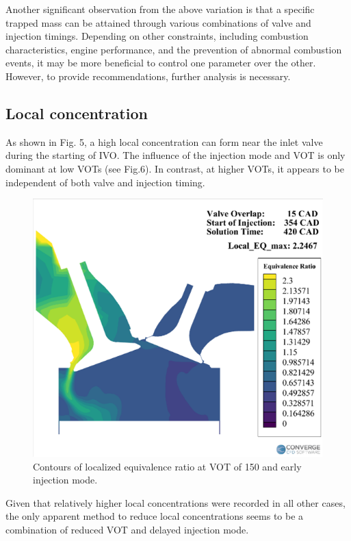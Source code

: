 \documentclass[conference]{IEEEtran}
\begin{document}
Another significant observation from the above variation is that a specific trapped mass can be attained through various combinations of valve and injection timings. 
Depending on other constraints, including combustion characteristics, engine performance, and the prevention of abnormal combustion events, it may be more beneficial to control one parameter over the other. 
However, to provide recommendations, further analysis is necessary.

\subsection{Local concentration}
As shown in Fig. 5, a high local concentration can form near the inlet valve during the starting of IVO. 
The influence of the injection mode and VOT is only dominant at low VOTs (see Fig.6). 
In contrast, at higher VOTs, it appears to be independent of both valve and injection timing.

\begin{figure}[htbp]
    \centerline{\includegraphics{plots and graphs/5.png}}
    \caption{Contours of localized equivalence ratio at VOT of 150 and early injection mode.}
    \label{plt_5}
    \end{figure}

Given that relatively higher local concentrations were recorded in all other cases, the only apparent method to reduce local concentrations seems to be a combination of reduced VOT and delayed injection mode.
\end{document}
